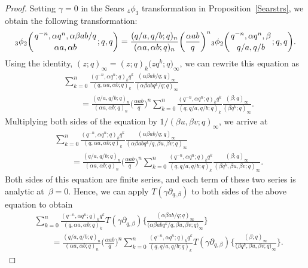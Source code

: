 \documentclass[pdftex]{sigma}
\numberwithin{equation}{section}
\begin{document}
\begin{proof}
Setting $\gamma=0$ in the Sears $_4\phi_3$ transformation in Proposition~\ref{Searstrs}, we obtain the following transformation:
\begin{align*}
{_3 \phi_2} \biggl({{q^{-n}, \alpha q^n, \alpha \beta ab/q}
\atop{\alpha a, \alpha b}}; q, q\biggr)
=\frac{(q/a, q/b; q)_n}{(\alpha a, \alpha b; q)_n}
\biggl(\frac{\alpha ab}{q}\biggr)^n
{_3 \phi_2} \biggl({{q^{-n}, \alpha q^n, \beta}
\atop{q/a, q/b}}; q, q\biggr).
\end{align*}
Using the identity, $(z; q)_\infty=(z; q)_k \bigl(zq^k; q\bigr)_\infty$, we can rewrite this equation as
\begin{align*}
&\sum_{k=0}^{n} \frac{(q^{-n}, \alpha q^n; q)_k q^k}{(q, \alpha a, \alpha b; q)_k}
\frac{(\alpha \beta ab/q; q)_\infty}{(\alpha \beta ab q^k/q; q)_\infty} \\
&\qquad{}=\frac{(q/a, q/b; q)_n}{(\alpha a, \alpha b; q)_n}
\biggl(\frac{\alpha ab}{q}\biggr)^n
\sum_{k=0}^{n} \frac{(q^{-n}, \alpha q^n; q)_k q^k}{(q, q/a, q/b; q)_k}
\frac{(\beta; q)_\infty}{(\beta q^k; q)_\infty}.
\end{align*}
Multiplying both sides of the equation by $1/(\beta u, \beta v; q)_\infty$, we arrive at
\begin{align*}
&\sum_{k=0}^{n} \frac{(q^{-n}, \alpha q^n; q)_k q^k}{(q, \alpha a, \alpha b; q)_k}
\frac{(\alpha \beta ab/q; q)_\infty}{(\alpha \beta ab q^k/q, \beta u, \beta v; q)_\infty} \\
&\qquad{}=\frac{(q/a, q/b; q)_n}{(\alpha a, \alpha b; q)_n}
\biggl(\frac{\alpha ab}{q}\biggr)^n
\sum_{k=0}^{n} \frac{(q^{-n}, \alpha q^n; q)_k q^k}{(q, q/a, q/b; q)_k}
\frac{(\beta; q)_\infty}{(\beta q^k, \beta u, \beta v; q)_\infty}.
\end{align*}
Both sides of this equation are finite series, and each term of these two series is analytic at~${\beta=0}$.
Hence, we can apply $T(\gamma \partial_{q, \beta})$ to both sides of the above equation
to obtain
\begin{align}
&\sum_{k=0}^{n} \frac{(q^{-n}, \alpha q^n; q)_k q^k}{(q, \alpha a, \alpha b; q)_k}
T(\gamma \partial_{q, \beta}) \biggl\{\frac{(\alpha \beta ab/q; q)_\infty}{\bigl(\alpha \beta ab q^k/q, \beta u, \beta v; q\bigr)_\infty} \biggr\}\nonumber\\
&\qquad{}=\frac{(q/a, q/b; q)_n}{(\alpha a, \alpha b; q)_n}
\biggl(\frac{\alpha ab}{q}\biggr)^n \sum_{k=0}^{n} \frac{(q^{-n}, \alpha q^n; q)_k q^k}{(q, q/a, q/b; q)_k}
T(\gamma \partial_{q, \beta})\biggl\{\frac{(\beta; q)_\infty}{\bigl(\beta q^k, \beta u, \beta v; q\bigr)_\infty}\biggr\}.

\end{align}
\end{proof}
\end{document}
